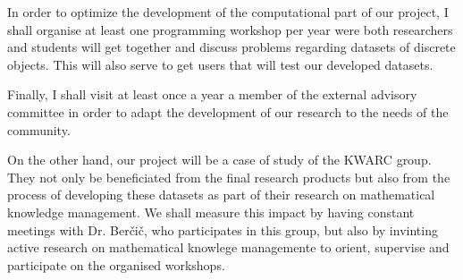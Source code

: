 In order to optimize the development of the computational part of our project, I shall organise at least one programming workshop per year were both researchers and students will get together and discuss problems regarding datasets of discrete objects.
This will also serve to get users that will test our developed datasets.

Finally, I shall visit at least once a year a member of the external advisory committee in order to adapt the development of our research to the needs of the community.

On the other hand, our project will be a case of study of the KWARC group.
They not only be beneficiated from the final research products but also from the process of developing these datasets as part of their research on mathematical knowledge management.
We shall measure this impact by having constant meetings with Dr. Berčič, who participates in this group, but also by invinting active research on mathematical knowlege managemente to orient, supervise and participate on the organised workshops.


%
%



